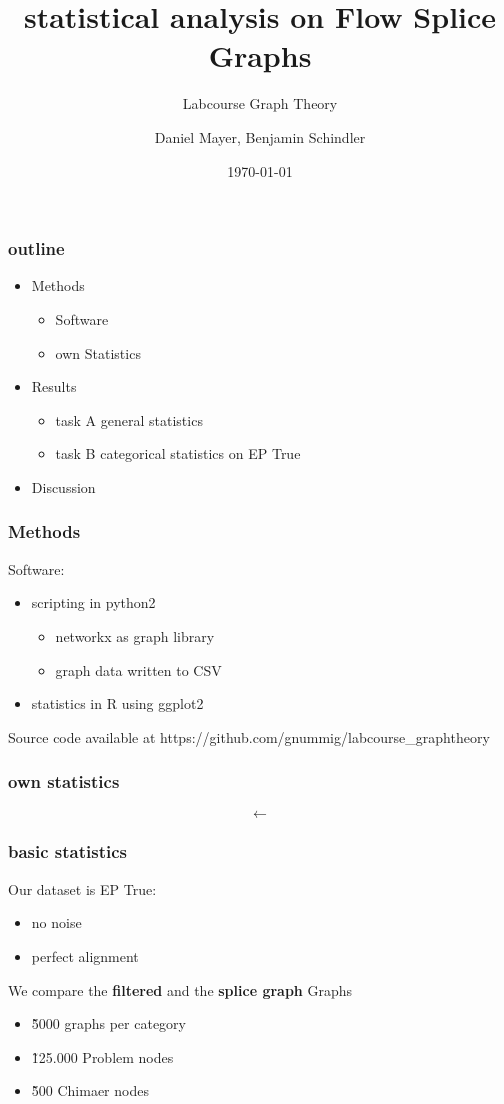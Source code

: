 \documentclass[10pt, compress]{beamer}
\title{statistical analysis on Flow Splice Graphs}
\subtitle{Labcourse Graph Theory}
\date{\today}
\author{Daniel Mayer, Benjamin Schindler}
\institute{University of Leipzig}
\begin{document}
\maketitle

\begin{frame}[fragile]
  \frametitle{outline}
\begin{itemize}
	\item  Methods
	\begin{itemize}
		\item Software
		\item own Statistics
	\end{itemize}
	\item Results
	\begin{itemize}
		\item task A general statistics
		\item task B categorical statistics on EP True 
	\end{itemize}
	\item Discussion
\end{itemize}
\end{frame}
\begin{frame}[fragile]
	\frametitle{Methods}
	Software:
	\begin{itemize}
		\item scripting in python2
			\begin{itemize}
				\item networkx as graph library
				\item graph data written to CSV
			\end{itemize}
		\item statistics in R using ggplot2
	\end{itemize}
	Source code available at https://github.com/gnummig/labcourse\_graphtheory
\end{frame}
\begin{frame}[fragile]
	\frametitle{own statistics }
	\begin{equation*}
	\leftarrow	
	\end{equation*}
\end{frame}
\begin{frame}[fragile]
	\frametitle{basic statistics}
	Our dataset is EP True:
	\begin{itemize}
		\item no noise	
		\item perfect alignment
	\end{itemize}
	We compare the \textbf{filtered} and the \textbf{splice graph} Graphs
	\begin{itemize}
		\item \~5000 graphs per category
		\item \~125.000 Problem nodes
		\item \~500 Chimaer nodes
	\end{itemize}

\end{frame}
\end{document}
